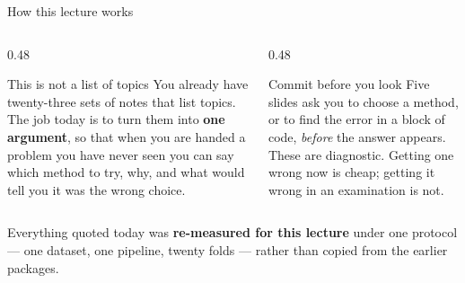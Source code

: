 \documentclass[aspectratio=169]{beamer}
\begin{document}
\begin{frame}[shrink=8]{How this lecture works}
  \begin{columns}[T]
    \begin{column}{0.48\textwidth}
      \begin{block}{This is not a list of topics}
        You already have twenty-three sets of notes that list topics. The job
        today is to turn them into \textbf{one argument}, so that when you
        are handed a problem you have never seen you can say which method to
        try, why, and what would tell you it was the wrong choice.
      \end{block}
    \end{column}
    \begin{column}{0.48\textwidth}
      \begin{alertblock}{Commit before you look}
        Five slides ask you to choose a method, or to find the error in a
        block of code, \emph{before} the answer appears. These are
        diagnostic. Getting one wrong now is cheap; getting it wrong in an
        examination is not.
      \end{alertblock}
    \end{column}
  \end{columns}
  \vspace{0.3em}
  \begin{center}
    \small Everything quoted today was \textbf{re-measured for this lecture}
    under one protocol --- one dataset, one pipeline, twenty folds --- rather
    than copied from the earlier packages.
  \end{center}
\end{frame}
\end{document}
